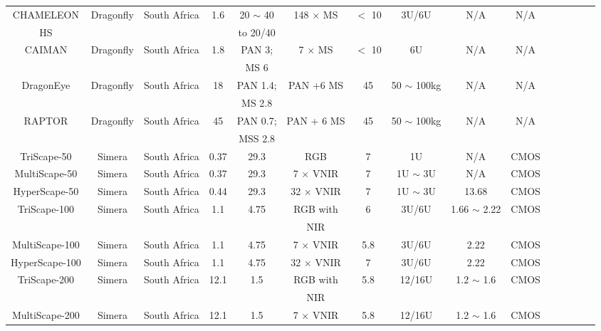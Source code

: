 \documentclass[final,5p,times,twocolumn,authoryear]{elsarticle}
\begin{document}
\begin{table}
{\begin{tabular}{c c c c c c c c c c c c c c c}
			CHAMELEON & Dragonfly & South Africa & 1.6 & 20 $\sim$ 40 &  148 $\times$ MS & $<$ 10 &  3U/6U & N/A & N/A & \citep{dragonfly2023} \\
			HS& & & & to 20/40 &  & & & & & & & & & \\
			CAIMAN &  Dragonfly & South Africa & 1.8 & PAN 3; &  7 $\times$ MS & $<$ 10 &  6U & N/A & N/A & \citep{dragonfly2023} \\
			& & & & MS 6 &  & & & & & & & & & \\
			DragonEye & Dragonfly & South Africa & 18 & PAN 1.4; &  PAN +6 MS & 45 & 50 $\sim$ 100kg & N/A & N/A & \citep{dragonfly2023}\\
			& & & & MS 2.8 &  & & & & & & & & & \\
			RAPTOR & Dragonfly & South Africa & 45 & PAN 0.7; &  PAN + 6 MS & 45 &  50 $\sim$ 100kg & N/A & N/A & \citep{dragonfly2023} \\
			& & & & MSS 2.8 &  & & & & & & & & & \\
			TriScape-50 & Simera & South Africa & 0.37 & 29.3 & RGB & 7 & 1U & N/A & CMOS  &\citep{casini2020towards, simer2023}\\
			MultiScape-50 & Simera & South Africa & 0.37 & 29.3 &  7 $\times$ VNIR & 7 & 1U $\sim$ 3U & N/A & CMOS & \citep{casini2020towards, simer2023}\\
			HyperScape-50 & Simera & South Africa & 0.44 & 29.3 & 32 $\times$ VNIR & 7 &  1U $\sim$ 3U & 13.68 & CMOS & \citep{casini2020towards, Simera2023}\\
			TriScape-100 & Simera & South Africa & 1.1 & 4.75 &  RGB with & 6 &  3U/6U & 1.66 $\sim$ 2.22 & CMOS & \citep{casini2020towards, Simera2023}\\
			& & & & &  NIR & & & & & & &  \\
			MultiScape-100 & Simera & South Africa & 1.1 & 4.75 & 7 $\times$ VNIR & 5.8 &  3U/6U & 2.22 & CMOS  & \citep{casini2020towards,  Simera2023}\\
			HyperScape-100 & Simera & South Africa & 1.1 & 4.75 &  32 $\times$ VNIR & 7 &  3U/6U & 2.22 & CMOS & \citep{casini2020towards, Simera2023}\\
			TriScape-200 & Simera & South Africa & 12.1 & 1.5 & RGB with & 5.8 &12/16U & 1.2 $\sim$ 1.6 & CMOS & \citep{Simera2023}\\
			& & & & &  NIR & & & & & & &  \\
			MultiScape-200 & Simera & South Africa & 12.1 & 1.5 & 7 $\times$ VNIR & 5.8 &  12/16U & 1.2 $\sim$ 1.6 & CMOS & \citep{Simera2023} \\

\end{tabular}}
\end{table}
\end{document}
